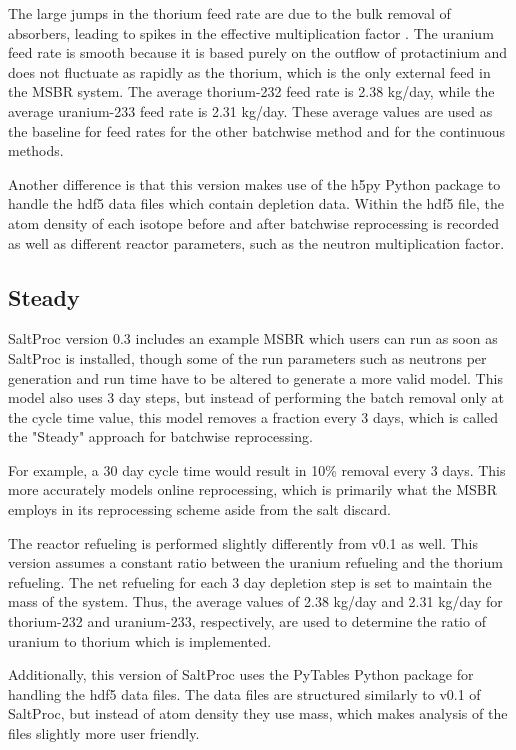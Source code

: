 The large jumps in the thorium feed rate are due to the bulk removal of absorbers, leading to spikes in the effective multiplication factor \cite{rykhlevskii_advanced_2018}. The uranium feed rate is smooth because it is based purely on the outflow of protactinium and does not fluctuate as rapidly as the thorium, which is the only external feed in the MSBR system. The average thorium-232 feed rate is 2.38 kg/day, while the average uranium-233 feed rate is 2.31 kg/day. These average values are used as the baseline for feed rates for the other batchwise method and for the continuous methods.

Another difference is that this version makes use of the h5py Python package to handle the hdf5 data files which contain depletion data. Within the hdf5 file, the atom density of each isotope before and after batchwise reprocessing is recorded as well as different reactor parameters, such as the neutron multiplication factor.

\subsection{Steady}

SaltProc version 0.3 includes an example MSBR which users can run as soon as SaltProc is installed, though some of the run parameters such as neutrons per generation and run time have to be altered to generate a more valid model. This model also uses 3 day steps, but instead of performing the batch removal only at the cycle time value, this model removes a fraction every 3 days, which is called the "Steady" approach for batchwise reprocessing.

For example, a 30 day cycle time would result in 10\% removal every 3 days. This more accurately models online reprocessing, which is primarily what the MSBR employs in its reprocessing scheme aside from the salt discard.

The reactor refueling is performed slightly differently from v0.1 as well. This version assumes a constant ratio between the uranium refueling and the thorium refueling. The net refueling for each 3 day depletion step is set to maintain the mass of the system. Thus, the average values of 2.38 kg/day and 2.31 kg/day for thorium-232 and uranium-233, respectively, are used to determine the ratio of uranium to thorium which is implemented.

Additionally, this version of SaltProc uses the PyTables Python package for handling the hdf5 data files. The data files are structured similarly to v0.1 of SaltProc, but instead of atom density they use mass, which makes analysis of the files slightly more user friendly.

